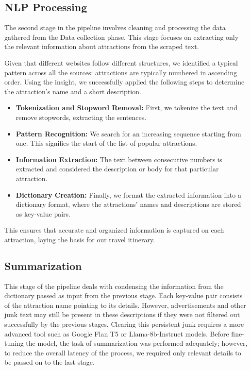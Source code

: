 \documentclass[manuscript,review,anonymous]{acmart}
\begin{document}
    \subsection{NLP Processing}
        The second stage in the pipeline involves cleaning and processing the data gathered from the Data collection phase. This stage focuses on extracting only the relevant information about attractions from the scraped text.
        
        Given that different websites follow different structures, we identified a typical pattern across all the sources: attractions are typically numbered in ascending order. Using the insight, we successfully applied the following steps to determine the attraction's name and a short description.
        
        \begin{itemize}
            \item \textbf{Tokenization and Stopword Removal:} First, we tokenize the text and remove stopwords, extracting the sentences.
            
            \item \textbf{Pattern Recognition:} We search for an increasing sequence starting from one. This signifies the start of the list of popular attractions.
            
            \item \textbf{Information Extraction:} The text between consecutive numbers is extracted and considered the description or body for that particular attraction.
            
            \item \textbf{Dictionary Creation:} Finally, we format the extracted information into a dictionary format, where the attractions' names and descriptions are stored as key-value pairs.
        \end{itemize}
        
        This ensures that accurate and organized information is captured on each attraction, laying the basis for our travel itinerary.
    
    \vspace{-7pt}
    
    \subsection{Summarization}
        This stage of the pipeline deals with condensing the information from the dictionary passed as input from the previous stage. Each key-value pair consists of the attraction name pointing to its details. However, advertisements and other junk text may still be present in these descriptions if they were not filtered out successfully by the previous stages. Clearing this persistent junk requires a more advanced tool such as Google Flan T5 or Llama-8b-Instruct models. Before fine-tuning the model, the task of summarization was performed adequately; however, to reduce the overall latency of the process, we required only relevant details to be passed on to the last stage.
        
\end{document}
